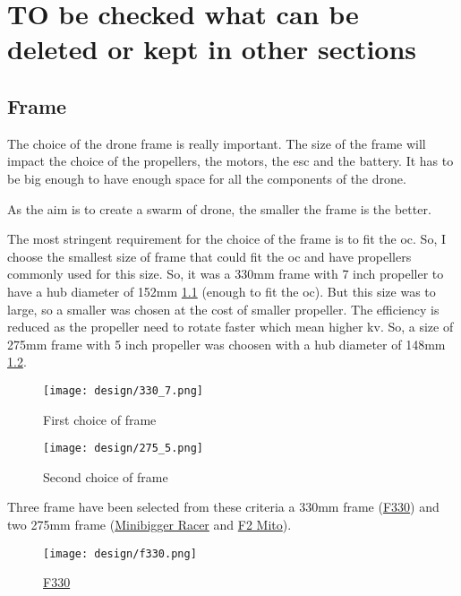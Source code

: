 \chapter{TO be checked what can be deleted or kept in other sections}
\section{Frame}
The choice of the drone frame is really important. The size of the frame will impact the choice of the propellers, the motors, the \acrshort{esc} and the battery. It has to be big enough to have enough space for all the components of the drone.

As the aim is to create a swarm of drone, the smaller the frame is the better.

The most stringent requirement for the choice of the frame is to fit the \gls{oc}. So, I choose the smallest size of frame that could fit the \gls{oc} and have propellers commonly used for this size. So, it was a 330mm frame with 7 inch propeller to have a hub diameter of 152mm \ref{fig:330_7} (enough to fit the \gls{oc}). But this size was to large, so a smaller was chosen at the cost of smaller propeller. The efficiency  is reduced as the propeller need to rotate faster which mean higher \gls{kv}. So, a size of 275mm frame with 5 inch propeller was choosen with a hub diameter of 148mm \ref{fig:275_5.png}.

\begin{figure}[!ht]
    \centering
    \texttt{[image: design/330\_7.png]}
    \caption{First choice of frame}
    \label{fig:330_7}
\end{figure}

\begin{figure}[!ht]
    \centering
    \texttt{[image: design/275\_5.png]}
    \caption{Second choice of frame}
    \label{fig:275_5.png}
\end{figure}

Three frame have been selected from these criteria a 330mm frame (\hyperref[fig:f330]{F330}) and two 275mm frame (\hyperref[fig:minibiggerracer]{Minibigger Racer} and \hyperref[fig:f2mito]{F2 Mito}).

\begin{figure}[!ht]
    \centering
    \texttt{[image: design/f330.png]}
    \caption{\href{https://www.banggood.com/DJI-F330-4-Axis-RC-Quadcopter-Frame-Kit-Support-KK-MK-MWC-p-943370.html?rmmds=search&ID=48074&cur_warehouse=CN}{F330}}
    \label{fig:f330}
\end{figure}

